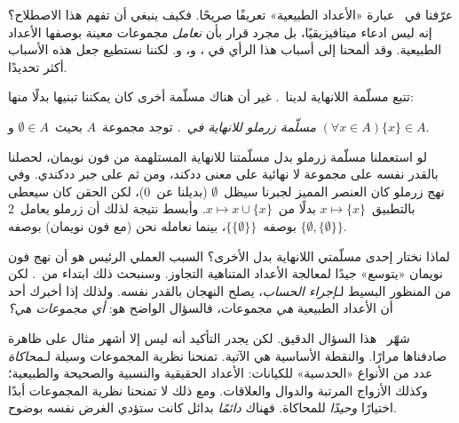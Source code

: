 \documentclass[../../../include/open-logic-section]{subfiles}
\begin{document}
	


عرّفنا في~ عبارة «الأعداد الطبيعية»
تعريفًا صريحًا. فكيف ينبغي أن تفهم هذا الاصطلاح؟ إنه ليس ادعاء
ميتافيزيقيًا، بل مجرد قرار بأن \emph{نعامل} مجموعات معينة بوصفها
الأعداد الطبيعية. وقد ألمحنا إلى أسباب هذا الرأي في
، و،
و. لكننا نستطيع جعل هذه
الأسباب أكثر تحديدًا.

تتبع مسلّمة اللانهاية لدينا~\citet{VonNeumann1925}. غير أن هناك
مسلّمة أخرى كان يمكننا تبنيها بدلًا منها:

\begin{defish}
\emph{مسلّمة زرملو للانهاية في~\citeyear{Zermelo1908Untersuchungen}.}
توجد مجموعة~$A$ بحيث~$\emptyset \in A$ و
$(\forall x \in A)\{x\} \in A$.
\end{defish}

لو استعملنا مسلّمة زرملو بدل مسلّمتنا للانهاية المستلهمة من فون نويمان،
لحصلنا بالقدر نفسه على مجموعة لا نهائية على معنى ددكند، ومن ثم على جبر
ددكندي. وفي نهج زرملو كان العنصر المميز لجبرنا سيظل~$\emptyset$
(بديلنا عن~$0$)، لكن الحقن كان سيعطى بالتطبيق~$x \mapsto \{x\}$ بدلًا
من~$x \mapsto x \cup \{x\}$. وأبسط نتيجة لذلك أن زرملو يعامل~$2$
بوصفه~$\{\{\emptyset\}\}$، بينما نعامله نحن (مع فون نويمان) بوصفه
$\{\emptyset, \{\emptyset\}\}$.

لماذا نختار إحدى مسلّمتي اللانهاية بدل الأخرى؟ السبب العملي الرئيس هو
أن نهج فون نويمان «يتوسع» جيدًا لمعالجة الأعداد المتناهية التجاوز.
وسنبحث ذلك ابتداء من~. لكن من المنظور البسيط
لـ\emph{إجراء الحساب}، يصلح النهجان بالقدر نفسه. ولذلك إذا أخبرك أحد
أن الأعداد الطبيعية \emph{هي} مجموعات، فالسؤال الواضح هو:
\emph{أي مجموعات هي؟}

شهّر~\citet{Benacerraf1965} هذا السؤال الدقيق. لكن يجدر التأكيد أنه
ليس إلا أشهر مثال على ظاهرة صادفناها مرارًا. والنقطة الأساسية هي
الآتية. تمنحنا نظرية المجموعات وسيلة لـ\emph{محاكاة} عدد من الأنواع
«الحدسية» للكيانات: الأعداد الحقيقية والنسبية والصحيحة والطبيعية؛ وكذلك
الأزواج المرتبة والدوال والعلاقات. ومع ذلك لا تمنحنا نظرية المجموعات
أبدًا اختيارًا \emph{وحيدًا} للمحاكاة. فهناك \emph{دائمًا} بدائل كانت
ستؤدي الغرض نفسه بوضوح.
\end{document}
